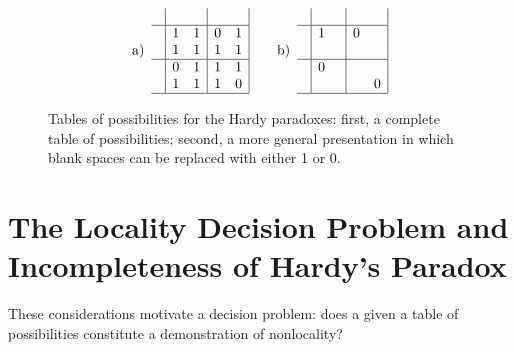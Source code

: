 \documentclass[reprint]{revtex4-1}
\theoremstyle{definition}
\begin{document}
\begin{figure}
\begin{equation*}\mbox{a)} \enspace
\begin{array}{c| c c | c c |}
&&&&\\ \hline
&1 &1  &0 & 1\\
&1&1  &1&1\\ \hline
&0&1&1&1 \\
&1&1 &1 &0 \\ \hline
\end{array}\quad\quad \mbox{b)} \enspace
\begin{array}{c| c c | c c |}
&&&&\\ \hline
&1 & & 0 & \\
&& & & \\ \hline
&0& & &  \\
&& & & 0 \\ \hline
\end{array}
\end{equation*}
\caption{Tables of possibilities for the Hardy paradoxes: first, a complete table of possibilities; second, a more general presentation in which blank spaces can be replaced with either 1 or 0.}
\label{HardyParadox}
\end{figure}





\section{The Locality Decision Problem and Incompleteness of Hardy's Paradox}\label{dpandincompleteness}


These considerations motivate a decision problem: does a given a table of possibilities constitute a demonstration of nonlocality?
\end{document}
